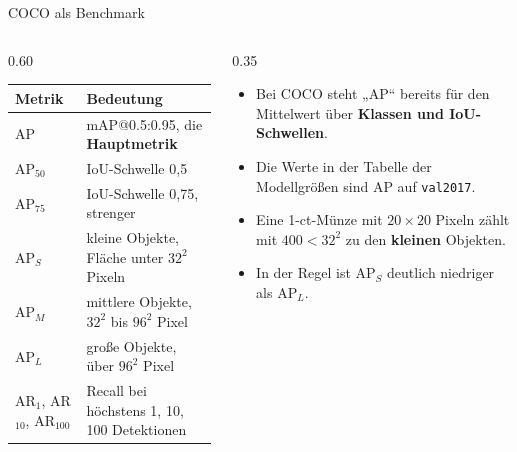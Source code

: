 \begin{frame}{COCO als Benchmark}
\footnotesize
\begin{columns}
\begin{column}{0.60\textwidth}
\centering
\begin{tabular}{ll}
\toprule
\textbf{Metrik} & \textbf{Bedeutung} \\
\midrule
AP & mAP@0.5:0.95, die \textbf{Hauptmetrik} \\
AP$_{50}$ & IoU-Schwelle 0,5 \\
AP$_{75}$ & IoU-Schwelle 0,75, strenger \\
AP$_S$ & kleine Objekte, Fläche unter $32^2$ Pixeln \\
AP$_M$ & mittlere Objekte, $32^2$ bis $96^2$ Pixel \\
AP$_L$ & große Objekte, über $96^2$ Pixel \\
AR$_{1}$, AR$_{10}$, AR$_{100}$ & Recall bei höchstens 1, 10, 100 Detektionen \\
\bottomrule
\end{tabular}
\end{column}
\begin{column}{0.35\textwidth}
\begin{itemize}
  \item Bei COCO steht „AP“ bereits für den Mittelwert über \textbf{Klassen und IoU-Schwellen}.
  \item Die Werte in der Tabelle der Modellgrößen sind AP auf \texttt{val2017}.
  \item Eine 1-ct-Münze mit $20 \times 20$ Pixeln zählt mit $400 < 32^2$ zu den \textbf{kleinen} Objekten.
  \item In der Regel ist AP$_S$ deutlich niedriger als AP$_L$.
\end{itemize}
\end{column}
\end{columns}
\end{frame}

